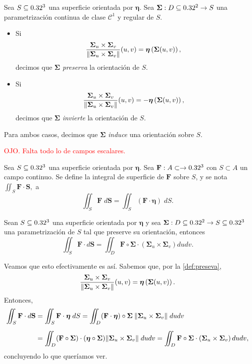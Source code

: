 \begin{definition}\label{def:preseva}
    Sea $S\subseteq0.32^3$ una superficie orientada por $\boldsymbol{\eta}$. Sea $\boldsymbol{\Sigma}:D\subseteq0.32^2\to S$ una parametrizaci\'on continua de clase $\mathcal{C}^1$ y regular de $S$.
    \begin{itemize}
        \item Si \[
            \frac{\boldsymbol{\Sigma}_u\times\boldsymbol{\Sigma}_v}{\norm{\boldsymbol{\Sigma}_u\times\boldsymbol{\Sigma}_v}}(u,v)=\boldsymbol{\eta}\left(\boldsymbol{\Sigma}(u,v)\right),
        \]  
        decimos que $\boldsymbol{\Sigma}$ \emph{preserva} la orientaci\'on de $S$.
        \item Si \[
            \frac{\boldsymbol{\Sigma}_u\times\boldsymbol{\Sigma}_v}{\norm{\boldsymbol{\Sigma}_u\times\boldsymbol{\Sigma}_v}}(u,v)=-\boldsymbol{\eta}\left(\boldsymbol{\Sigma}(u,v)\right),
        \]
        decimos que $\boldsymbol{\Sigma}$ \emph{invierte} la orientaci\'on de $S$.  
    \end{itemize}
    Para ambos casos, decimos que $\boldsymbol{\Sigma}$ \emph{induce} una orientaci\'on sobre $S$.
\end{definition}

 \textcolor{red}{OJO. Falta todo lo de campos escalares.}

\begin{definition}
    Sea $S\subseteq0.32^3$ una superficie orientada por $\boldsymbol{\eta}$. Sea $\mathbf{F}:A \subset \to0.32^3$ con $S\subset A$ un campo continuo. Se define la integral de superficie de $\mathbf{F}$ sobre $S$, y se nota  $\iint_S\mathbf{F}\cdot \mathbf{S},$ a
    \[
        \iint_S \mathbf{F}\;d\mathbf{S}=\iint_S (\mathbf{F}\cdot\boldsymbol{\eta}) \;dS.
    \]
\end{definition}

\begin{obs}   Sean $S\subseteq0.32^3$ una superficie orientada por $\boldsymbol{\eta}$ y  sea  $\boldsymbol{\Sigma}:D\subseteq0.32^2\to S\subseteq0.32^3$ una parametrizaci\'on de $S$ tal que preserve su orientaci\'on, entonces 
 $$ \iint_S \mathbf{F}\cdot d\mathbf{S} = \iint_D \mathbf{F}\circ\boldsymbol{\Sigma}\cdot\left(\boldsymbol{\Sigma}_u\times\boldsymbol{\Sigma}_v\right)dudv.$$
\end{obs}
Veamos que esto efectivamente es as\'i.  Sabemos que, por la \autoref{def:preseva},
\[
    \frac{\boldsymbol{\Sigma}_u\times\boldsymbol{\Sigma}_v}{\norm{\boldsymbol{\Sigma}_u\times\boldsymbol{\Sigma}_v}}(u,v)=\boldsymbol{\eta}\left(\boldsymbol{\Sigma}(u,v)\right).
\]
Entonces,
\begin{align*}
    \iint_S \mathbf{F}\cdot d\mathbf{S}&=\iint_S \mathbf{F}\cdot\boldsymbol{\eta}\;dS=\iint_D (\mathbf{F}\cdot\boldsymbol{\eta})\circ\boldsymbol{\Sigma}\:\norm{\boldsymbol{\Sigma}_u\times\boldsymbol{\Sigma}_v}\;dudv\\[.2cm]
    &=\iint_D (\mathbf{F}\circ\boldsymbol{\Sigma})\cdot(\boldsymbol{\eta}\circ\boldsymbol{\Sigma})\norm{\boldsymbol{\Sigma}_u\times\boldsymbol{\Sigma}_v}\;dudv=\iint_D \mathbf{F}\circ\boldsymbol{\Sigma}\cdot\left(\boldsymbol{\Sigma}_u\times\boldsymbol{\Sigma}_v\right)dudv,
\end{align*} concluyendo lo que quer\'iamos ver.

